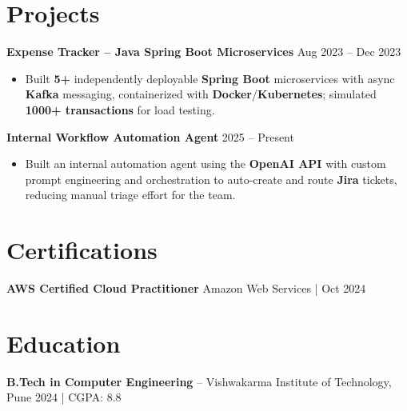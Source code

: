 \documentclass[a4paper,10pt]{article}
\begin{document}
\section*{Projects}

\textbf{Expense Tracker -- Java Spring Boot Microservices} \hfill Aug 2023 -- Dec 2023
\begin{itemize}[leftmargin=*]
    \item Built \textbf{5+} independently deployable \textbf{Spring Boot} microservices with async \textbf{Kafka} messaging, containerized with \textbf{Docker}/\textbf{Kubernetes}; simulated \textbf{1000+ transactions} for load testing.
\end{itemize}

\textbf{Internal Workflow Automation Agent} \hfill 2025 -- Present
\begin{itemize}[leftmargin=*]
    \item Built an internal automation agent using the \textbf{OpenAI API} with custom prompt engineering and orchestration to auto-create and route \textbf{Jira} tickets, reducing manual triage effort for the team.
\end{itemize}

\section*{Certifications}
\textbf{AWS Certified Cloud Practitioner} \hfill Amazon Web Services \;|\; Oct 2024

\section*{Education}
\textbf{B.Tech in Computer Engineering} -- Vishwakarma Institute of Technology, Pune \hfill 2024 \;|\; CGPA: 8.8
\end{document}
